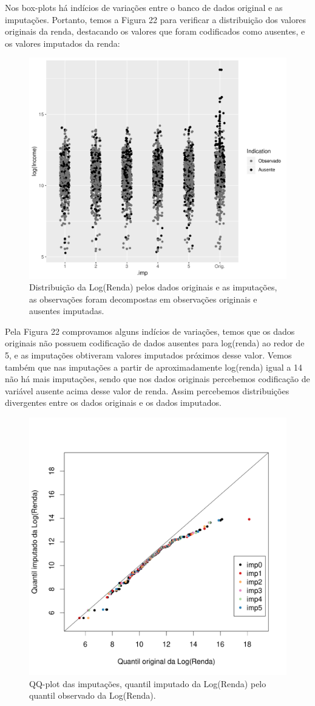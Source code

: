 \documentclass[]{article}
\begin{document}
Nos box-plots há indícios de variações entre o banco de dados original e
as imputações. Portanto, temos a Figura 22 para verificar a distribuição
dos valores originais da renda, destacando os valores que foram
codificados como ausentes, e os valores imputados da renda:

\begin{figure}[H]

{\centering \includegraphics[width=0.6\linewidth]{Relatorio_IC_files/figure-latex/unnamed-chunk-30-1} 

}

\caption{Distribuição da Log(Renda) pelos dados originais e as imputações, as observações foram decompostas em observações originais e ausentes imputadas.}\label{fig:unnamed-chunk-30}
\end{figure}

Pela Figura 22 comprovamos alguns indícios de variações, temos que os
dados originais não possuem codificação de dados ausentes para
log(renda) ao redor de 5, e as imputações obtiveram valores imputados
próximos desse valor. Vemos também que nas imputações a partir de
aproximadamente log(renda) igual a 14 não há mais imputações, sendo que
nos dados originais percebemos codificação de variável ausente acima
desse valor de renda. Assim percebemos distribuições divergentes entre
os dados originais e os dados imputados.

\begin{figure}[H]

{\centering \includegraphics[width=0.6\linewidth]{p62-graf} 

}

\caption{QQ-plot das imputações, quantil imputado da Log(Renda) pelo quantil observado da Log(Renda).}\label{fig:unnamed-chunk-31}
\end{figure}
\end{document}
